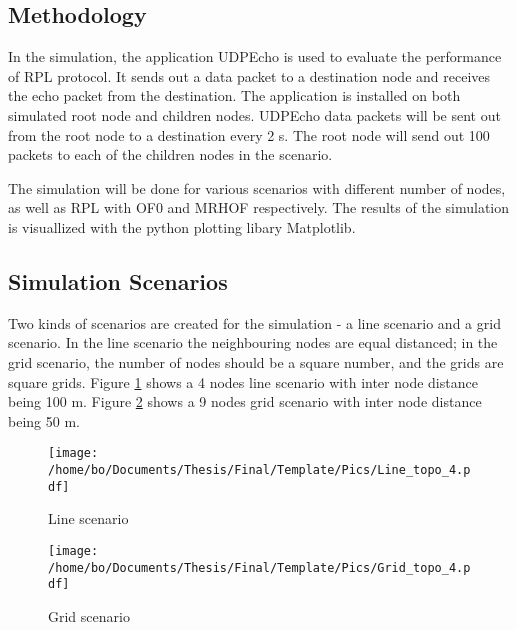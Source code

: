 \subsection{Methodology}
\label{Sim:Method}
In the simulation, the application UDPEcho is used to evaluate the performance of RPL protocol. It sends out a data packet to a destination node and receives the echo packet from the destination. The application is installed on both simulated root node and children nodes. UDPEcho data packets will be sent out from the root node to a destination every 2 s. The root node will send out 100 packets to each of the children nodes in the scenario. 
\newline

The simulation will be done for various scenarios with different number of nodes, as well as RPL with OF0 and MRHOF respectively. The results of the simulation is visuallized with the python plotting libary Matplotlib.

\subsection{Simulation Scenarios}
\label{Sim:Scenarios}
Two kinds of scenarios are created for the simulation - a line scenario and a grid scenario. In the line scenario the neighbouring nodes are equal distanced; in the grid scenario, the number of nodes should be a square number, and the grids are square grids. Figure \ref{fig:scenario_line} shows a 4 nodes line scenario with inter node distance being 100 m. Figure \ref{fig:scenario_grid} shows a 9 nodes grid scenario with inter node distance being 50 m. 

\begin{figure}[htbp]
  \begin{center}
    \leavevmode
      \texttt{[image: /home/bo/Documents/Thesis/Final/Template/Pics/Line\_topo\_4.pdf]}
    \caption{Line scenario}
    \label{fig:scenario_line}
  \end{center}
\end{figure}

\begin{figure}[htbp]
  \begin{center}
    \leavevmode
      \texttt{[image: /home/bo/Documents/Thesis/Final/Template/Pics/Grid\_topo\_4.pdf]}
    \caption{Grid scenario}
    \label{fig:scenario_grid}
  \end{center}
\end{figure}

